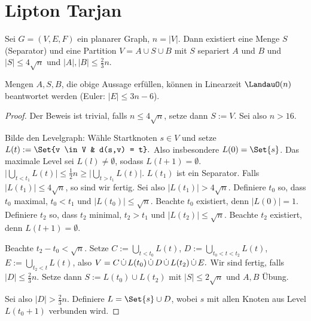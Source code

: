 \chapter{Lipton Tarjan}


Sei $G = (V, E, F)$ ein planarer Graph, $n = |V|$.
Dann existiert eine Menge $S$ (Separator) und eine Partition $V = A \cup S \cup B$ mit $S$ separiert $A$ und $B$ und $|S| \le 4 \sqrt n$ und $|A|, |B| \le \frac{2}{3} n$.

Mengen $A, S, B$, die obige Aussage erfüllen, können in Linearzeit $\LandauO(n)$ beantwortet werden (Euler: $|E| \le 3n - 6$).

\begin{proof}
    Der Beweis ist trivial, falls $n \le 4 \sqrt n$, setze dann $S := V$.
    Sei also $n > 16$.

    Bilde den Levelgraph:
    Wähle Startknoten $s \in V$ und setze
    \begin{math}
        L(t) := \Set{v \in V & d(s,v) = t}.
    \end{math}
    Also insbesondere $L(0) = \Set{s}$.
    Das maximale Level sei $L(l) \neq \emptyset$, sodass $L(l+1) = \emptyset$.
    \begin{math}
        \Big| \bigcup_{t<t_1} L(t) \Big|
        \le \frac{1}{2} n \ge
        \Big| \bigcup_{t>t_1} L(t) \Big|.
    \end{math}
    $L(t_1)$ ist ein Separator.
    Falls $|L(t_1)| \le 4 \sqrt n$, so sind wir fertig. 
    Sei also $|L(t_1)| > 4 \sqrt n$.
    Definiere $t_0$ so, dass $t_0$ maximal, $t_0 < t_1$ und $|L(t_0)| \le \sqrt n$.
    Beachte $t_0$ existiert, denn $|L(0)| = 1$.
    Definiere $t_2$ so, dass $t_2$ minimal, $t_2 > t_1$ und $|L(t_2)| \le \sqrt n$.
    Beachte $t_2$ existiert, denn $L(l+1) = \emptyset$.

    Beachte $t_2 - t_0 < \sqrt n$. %
    Setze $C := \bigcup_{t<t_0} L(t)$, $D := \bigcup_{t_0 < t < t_2} L(t)$, $E := \bigcup_{t_2 < t} L(t)$, also
    \begin{math}
        V = C \mathop{\dot \cup} L(t_0) \mathop{\dot \cup} D \mathop{\dot \cup} L(t_2) \mathop{\dot \cup} E.
    \end{math}
    Wir sind fertig, falls $|D| \le \frac{2}{3} n$.
    Setze dann $S := L(t_0) \cup L(t_2)$ mit $|S| \le 2 \sqrt n$ und $A, B$ Übung.

    Sei also $|D| > \frac{2}{3}n$.
    Definiere $L = \Set{s} \cup D$, wobei $s$ mit allen Knoten aus Level $L(t_0 + 1)$ verbunden wird.


\end{proof}
